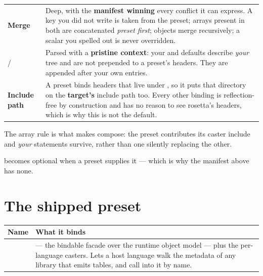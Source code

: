 \begin{center}
\small
\begin{tabular}{@{}lL{10.0cm}@{}}
\toprule
\textbf{Merge} & Deep, with the \textbf{manifest winning} every conflict it can
  express. A key you did not write is taken from the preset; arrays present in
  both are concatenated \emph{preset first}; objects merge recursively; a scalar
  you spelled out is never overridden. \\
\addlinespace
{} /  & Parsed with a \textbf{pristine context}:
  your  and  defaults describe \emph{your}
  tree and are not prepended to a preset's headers. They are appended after your
  own entries. \\
\addlinespace
\textbf{Include path} & A preset binds headers that live under
  , so it puts that directory on the \textbf{target's}
  include path too. Every other binding is reflection-free by construction and
  has no reason to see rosetta's headers, which is why this is not the default. \\
\bottomrule
\end{tabular}
\end{center}

The array rule is what makes  compose: the preset
contributes its caster include and \emph{your} statements survive, rather than
one silently replacing the other.

 becomes optional when a preset supplies it --- which is why the
manifest above has none.

\section{The shipped preset}

\begin{center}
\small
\begin{tabular}{@{}lL{10.2cm}@{}}
\toprule
\textbf{Name} & \textbf{What it binds} \\
\midrule
{} &  --- the bindable facade over the
  runtime object model --- plus the per-language  casters. Lets a
  host language walk the metadata of any library that emits 
  tables, and call into it by name. \\
\bottomrule
\end{tabular}
\end{center}

